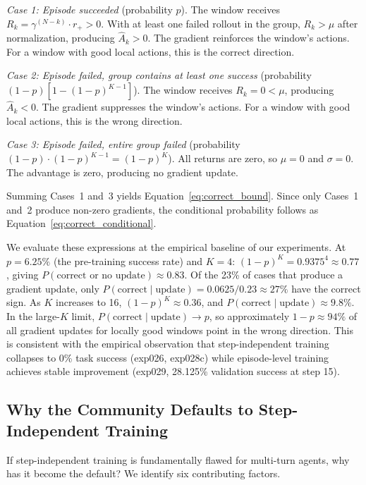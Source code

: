 \textit{Case 1: Episode succeeded} (probability $p$). The window receives $R_k = \gamma^{(N-k)} \cdot r_+ > 0$. With at least one failed rollout in the group, $R_k > \mu$ after normalization, producing $\hat{A}_k > 0$. The gradient reinforces the window's actions. For a window with good local actions, this is the correct direction.

\textit{Case 2: Episode failed, group contains at least one success} (probability $(1-p)[1 - (1-p)^{K-1}]$). The window receives $R_k = 0 < \mu$, producing $\hat{A}_k < 0$. The gradient suppresses the window's actions. For a window with good local actions, this is the wrong direction.

\textit{Case 3: Episode failed, entire group failed} (probability $(1-p) \cdot (1-p)^{K-1} = (1-p)^{K}$). All returns are zero, so $\mu = 0$ and $\sigma = 0$. The advantage is zero, producing no gradient update.

Summing Cases~1 and~3 yields Equation~\ref{eq:correct_bound}. Since only Cases~1 and~2 produce non-zero gradients, the conditional probability follows as Equation~\ref{eq:correct_conditional}.

We evaluate these expressions at the empirical baseline of our experiments. At $p = 6.25\%$ (the pre-training success rate) and $K = 4$: $(1-p)^K = 0.9375^4 \approx 0.77$, giving $P(\text{correct or no update}) \approx 0.83$. Of the 23\% of cases that produce a gradient update, only $P(\text{correct} \mid \text{update}) = 0.0625 / 0.23 \approx 27\%$ have the correct sign. As $K$ increases to 16, $(1-p)^{K} \approx 0.36$, and $P(\text{correct} \mid \text{update}) \approx 9.8\%$. In the large-$K$ limit, $P(\text{correct} \mid \text{update}) \to p$, so approximately $1 - p \approx 94\%$ of all gradient updates for locally good windows point in the wrong direction. This is consistent with the empirical observation that step-independent training collapses to 0\% task success (exp026, exp028c) while episode-level training achieves stable improvement (exp029, 28.125\% validation success at step 15).

\subsection{Why the Community Defaults to Step-Independent Training}
\label{sec:why_defaults}

If step-independent training is fundamentally flawed for multi-turn agents, why has it become the default? We identify six contributing factors.

